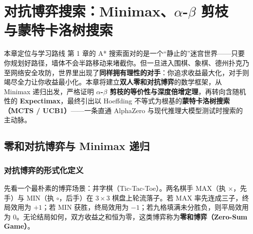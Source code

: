 \chapter[对抗博弈、\texorpdfstring{$\alpha$-$\beta$}{α-β} 剪枝与 MCTS]{对抗博弈搜索：Minimax、\texorpdfstring{$\alpha$-$\beta$}{α-β} 剪枝\\与蒙特卡洛树搜索}\label{ch:games}

\begin{chapIntro}{本章定位与学习路线}
第 1 章的 A* 搜索面对的是一个“静止的”迷宫世界——只要你规划好路径，墙体不会半路移动来堵截你。但一旦进入围棋、象棋、德州扑克乃至网络安全攻防，世界里出现了\textbf{同样拥有理性的对手}：你追求收益最大化，对手则竭尽全力让你收益最小化。本章将建立\textbf{双人零和对抗博弈}的数学框架，从 Minimax 递归出发，严格证明 \textbf{$\alpha$-$\beta$ 剪枝的等价性与深度倍增定理}，再转向含随机性的 \textbf{Expectimax}，最终引出以 Hoeffding 不等式为根基的\textbf{蒙特卡洛树搜索（MCTS / UCB1）}——一条直通 AlphaZero 与现代推理大模型测试时搜索的主动脉。
\end{chapIntro}

\section{零和对抗博弈与 Minimax 递归}\label{sec:minimax}

\subsection{对抗博弈的形式化定义}

先看一个最朴素的博弈场景：井字棋（Tic-Tac-Toe）。两名棋手 \textsf{MAX}（执 $\times$，先手）与 \textsf{MIN}（执 $\circ$，后手）在 $3\times 3$ 棋盘上轮流落子。若 \textsf{MAX} 率先连成三子，终局效用为 $+1$；若 \textsf{MIN} 获胜，终局效用为 $-1$；若九格填满未分胜负，则平局效用为 $0$。无论结局如何，双方收益之和恒为零，这类博弈称为\textbf{零和博弈（Zero-Sum Game）}。

